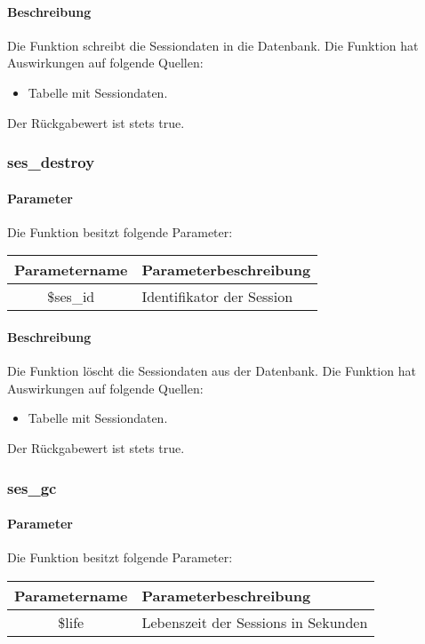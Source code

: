 \paragraph{Beschreibung} Die Funktion schreibt die Sessiondaten in die Datenbank. Die Funktion hat Auswirkungen auf folgende Quellen:
\begin{itemize}
	\item Tabelle mit Sessiondaten.
\end{itemize}
Der Rückgabewert ist stets {\glqq true\grqq}.
\subsubsection{ses\_destroy}
\paragraph{Parameter} Die Funktion besitzt folgende Parameter:
\begin{table}[H]
	\begin{tabular}{|c|p{11cm}|}
		\hline
		\textbf{Parametername} & \textbf{Parameterbeschreibung} \\ \hline
		\$ses\_id & Identifikator der Session \\ \hline
	\end{tabular}
\end{table}
\paragraph{Beschreibung} Die Funktion löscht die Sessiondaten aus der Datenbank. Die Funktion hat Auswirkungen auf folgende Quellen:
\begin{itemize}
	\item Tabelle mit Sessiondaten.
\end{itemize}
Der Rückgabewert ist stets {\glqq true\grqq}.
\subsubsection{ses\_gc}
\paragraph{Parameter} Die Funktion besitzt folgende Parameter:
\begin{table}[H]
	\begin{tabular}{|c|p{11cm}|}
		\hline
		\textbf{Parametername} & \textbf{Parameterbeschreibung} \\ \hline
		\$life & Lebenszeit der Sessions in Sekunden \\ \hline
	\end{tabular}
\end{table}
